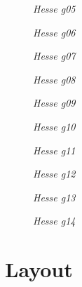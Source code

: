 \documentclass[12pt,a4paper,twosides,ngerman]{scrbook}
\begin{document}
\begin{figure}[htbp]
\epsfysize=3.0in
\centerline{}
\caption{\em Hesse g05}\label{fig1}
\end{figure}

\begin{figure}[htbp]
\epsfysize=3.0in
\centerline{}
\caption{\em Hesse g06}\label{fig1}
\end{figure}

\begin{figure}[htbp]
\epsfysize=3.0in
\centerline{}
\caption{\em Hesse g07}\label{fig1}
\end{figure}

\begin{figure}[htbp]
\epsfysize=3.0in
\centerline{}
\caption{\em Hesse g08}\label{fig1}
\end{figure}

\begin{figure}[htbp]
\epsfysize=3.0in
\centerline{}
\caption{\em Hesse g09}\label{fig1}
\end{figure}

\begin{figure}[htbp]
\epsfysize=3.0in
\centerline{}
\caption{\em Hesse g10}\label{fig1}
\end{figure}

\begin{figure}[htbp]
\epsfysize=3.0in
\centerline{}
\caption{\em Hesse g11}\label{fig1}
\end{figure}

\begin{figure}[htbp]
\epsfysize=3.0in
\centerline{}
\caption{\em Hesse g12}\label{fig1}
\end{figure}


\begin{figure}[htbp]
\epsfysize=3.0in
\centerline{}
\caption{\em Hesse g13}\label{fig1}
\end{figure}

\begin{figure}[htbp]
\epsfysize=3.0in
\centerline{}
\caption{\em Hesse g14}\label{fig1}
\end{figure}

 

 

\chapter{Layout}
\end{document}
